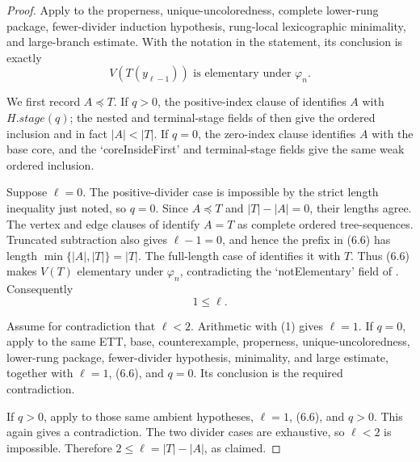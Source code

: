 \begin{proof}
Apply  to the
properness, unique-uncoloredness, complete lower-rung package,
fewer-divider induction hypothesis, rung-local lexicographic minimality,
and large-branch estimate.  With the notation in the statement, its
conclusion is exactly
\[
 V(T(y_{\ell-1}))\text{ is elementary under }\varphi_n.       \tag{6.6}
\]

We first record $A\preccurlyeq T$.  If $q>0$, the positive-index clause
of  identifies $A$ with
$H.\mathit{stage}(q)$; the nested and terminal-stage fields of
 then give the ordered inclusion and in fact
$|A|<|T|$.  If $q=0$, the zero-index clause identifies $A$ with the
base core, and the `coreInsideFirst' and terminal-stage fields give the
same weak ordered inclusion.

Suppose $\ell=0$.  The positive-divider case is impossible by the strict
length inequality just noted, so $q=0$.  Since $A\preccurlyeq T$ and
$|T|-|A|=0$, their lengths agree.  The vertex and edge clauses of
 identify $A=T$ as complete ordered
tree-sequences.  Truncated subtraction also gives $\ell-1=0$, and hence
the prefix in (6.6) has length
$\min\{|A|,|T|\}=|T|$.  The full-length case of
 identifies it with $T$.  Thus (6.6) makes
$V(T)$ elementary under $\varphi_n$, contradicting the `notElementary'
field of .  Consequently
\[
                              1\leq\ell.                      \tag{1}
\]

Assume for contradiction that $\ell<2$.  Arithmetic with (1) gives
$\ell=1$.  If $q=0$, apply
 to
the same ETT, base, counterexample, properness, unique-uncoloredness,
lower-rung package, fewer-divider hypothesis, minimality, and large
estimate, together with $\ell=1$, (6.6), and $q=0$.  Its conclusion is
the required contradiction.

If $q>0$, apply
to those same ambient hypotheses, $\ell=1$, (6.6), and $q>0$.  This
again gives a contradiction.  The two divider cases are exhaustive, so
$\ell<2$ is impossible.  Therefore
$2\leq\ell=|T|-|A|$, as claimed.
\end{proof}
